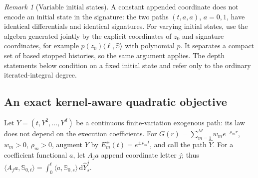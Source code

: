 \documentclass[11pt]{article}
\numberwithin{equation}{section}
\theoremstyle{definition}
\theoremstyle{remark}
\newtheorem{remark}[theorem]{Remark}
\theoremstyle{definition}
\newcommand{\dd}{\,\mathrm d}
\begin{document}
\begin{remark}[Variable initial states]
A constant appended coordinate does not encode an initial state in the
signature: the two paths $(t,a,a)$, $a=0,1$, have identical differentials and
identical signatures. For varying initial states, use the algebra generated
jointly by the explicit coordinates of $z_0$ and signature coordinates, for
example $p(z_0)\langle\ell,\mathbb S\rangle$ with polynomial $p$.
It separates a compact set of based stopped histories, so the same argument
applies. The depth statements below condition on a fixed initial state and
refer only to the ordinary iterated-integral degree.
\end{remark}

\subsection{An exact kernel-aware quadratic objective}
Let $Y=(t,Y^2,\ldots,Y^d)$ be a continuous finite-variation exogenous path:
its law does not depend on the execution coefficients. For
$G(r)=\sum_{m=1}^Mw_me^{-\rho_m r}$, $w_m>0$, $\rho_m>0$, augment $Y$ by
$E_m^\pm(t)=e^{\pm\rho_m t}$, and call the path $\widehat Y$.
For a coefficient functional $a$, let $A_j a$ append coordinate letter $j$;
thus $\langle A_j a,\mathbb S_{0,t}\rangle
=\int_0^t\langle a,\mathbb S_{0,s}\rangle\dd\widehat Y_s^j$.
\end{document}
